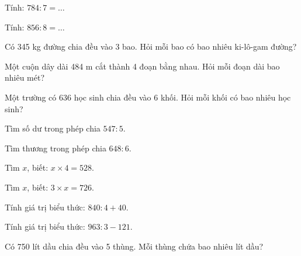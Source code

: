 \begin{ex}
Tính: $784 : 7 = \dots$
\end{ex}

\begin{ex}
Tính: $856 : 8 = \dots$
\end{ex}

\begin{ex}
Có 345 kg đường chia đều vào 3 bao. Hỏi mỗi bao có bao nhiêu ki-lô-gam đường?
\end{ex}

\begin{ex}
Một cuộn dây dài 484 m cắt thành 4 đoạn bằng nhau. Hỏi mỗi đoạn dài bao nhiêu mét?
\end{ex}

\begin{ex}
Một trường có 636 học sinh chia đều vào 6 khối. Hỏi mỗi khối có bao nhiêu học sinh?
\end{ex}

\begin{ex}
Tìm số dư trong phép chia $547 : 5$.
\end{ex}

\begin{ex}
Tìm thương trong phép chia $648 : 6$.
\end{ex}

\begin{ex}
Tìm $x$, biết: $x \times 4 = 528$.
\end{ex}

\begin{ex}
Tìm $x$, biết: $3 \times x = 726$.
\end{ex}

\begin{ex}
Tính giá trị biểu thức: $840 : 4 + 40$.
\end{ex}

\begin{ex}
Tính giá trị biểu thức: $963 : 3 - 121$.
\end{ex}

\begin{ex}
Có 750 lít dầu chia đều vào 5 thùng. Mỗi thùng chứa bao nhiêu lít dầu?
\end{ex}
